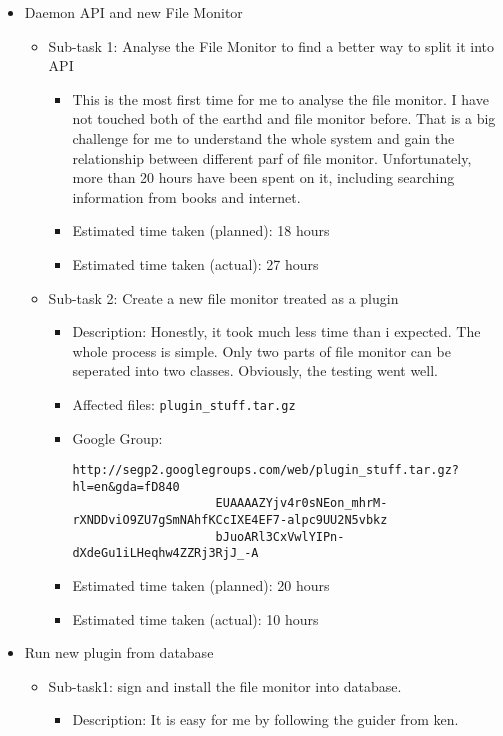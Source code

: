 \documentclass{article}
\begin{document}
\begin{itemize}
	\item Daemon API and new File Monitor
	     \begin{itemize}
	        \item Sub-task 1: Analyse the File Monitor to find a better way to split it into API
	           \begin{itemize}
					\item This is the most first time for me to analyse the file monitor. I have not touched both of the earthd and file monitor before. That is a big challenge for me to understand the whole system and gain the relationship between different parf of file monitor. Unfortunately, more than 20 hours have been spent on it, including searching information from books and internet. 
					\item Estimated time taken (planned): 18 hours
					\item Estimated time taken (actual): 27 hours
				\end{itemize}
			\item Sub-task 2: Create a new file monitor treated as a plugin
			   \begin{itemize}
					\item Description: Honestly, it took much less time than i expected. The whole process is simple. Only two parts of file monitor can be seperated into two classes. Obviously, the testing went well.
					\item Affected files: \texttt{plugin\_stuff.tar.gz} 
					\item Google Group: \begin{verbatim}http://segp2.googlegroups.com/web/plugin_stuff.tar.gz?hl=en&gda=fD840
					EUAAAAZYjv4r0sNEon_mhrM-rXNDDviO9ZU7gSmNAhfKCcIXE4EF7-alpc9UU2N5vbkz
					bJuoARl3CxVwlYIPn-dXdeGu1iLHeqhw4ZZRj3RjJ_-A\end{verbatim}
					\item Estimated time taken (planned): 20 hours
					\item Estimated time taken (actual): 10 hours
				\end{itemize}
	     \end{itemize}
	\item Run new plugin from database
	     \begin{itemize}
	         \item Sub-task1: sign and install the file monitor into database.
	            \begin{itemize}
							\item Description: It is easy for me by following the guider from ken. 

\end{itemize}
\end{itemize}
\end{itemize}
\end{document}
